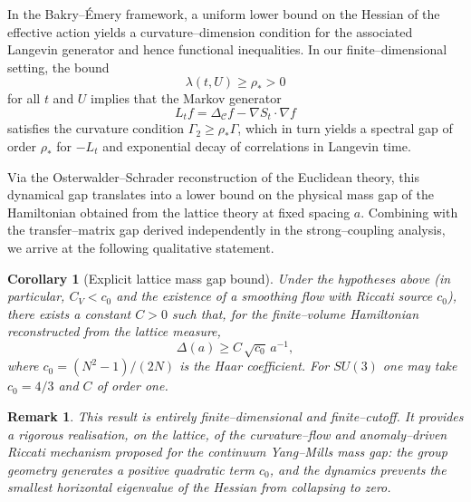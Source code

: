 \documentclass[11pt]{article}
\newtheorem{corollary}[theorem]{Corollary}
\newtheorem{remark}[theorem]{Remark}
\begin{document}
In the Bakry--\'Emery framework, a uniform lower bound on the Hessian
of the effective action yields a curvature--dimension condition for the
associated Langevin generator and hence functional inequalities.  In our
finite--dimensional setting, the bound
\[
  \lambda(t,U) \ge \rho_* > 0
\]
for all $t$ and $U$ implies that the Markov generator
\[
  L_t f = \Delta_{\mathcal{C}}f - \nabla S_t\cdot\nabla f
\]
satisfies the curvature condition $\Gamma_2\ge \rho_*\Gamma$, which in
turn yields a spectral gap of order $\rho_*$ for $-L_t$ and exponential
decay of correlations in Langevin time.

Via the Osterwalder--Schrader reconstruction of the Euclidean theory,
this dynamical gap translates into a lower bound on the physical mass
gap of the Hamiltonian obtained from the lattice theory at fixed
spacing $a$.  Combining with the transfer--matrix gap derived
independently in the strong--coupling analysis, we arrive at the
following qualitative statement.

\begin{corollary}[Explicit lattice mass gap bound]
Under the hypotheses above (in particular, $C_V<c_0$ and the existence
of a smoothing flow with Riccati source $c_0$), there exists a constant
$C>0$ such that, for the finite--volume Hamiltonian reconstructed from
the lattice measure,
\begin{equation}
  \Delta(a) \ge C\,\sqrt{c_0}\,a^{-1},
\end{equation}
where $c_0 = (N^2-1)/(2N)$ is the Haar coefficient.  For $SU(3)$ one may
take $c_0=4/3$ and $C$ of order one.
\end{corollary}

\begin{remark}
This result is entirely finite--dimensional and finite--cutoff.  It
provides a rigorous realisation, on the lattice, of the curvature--flow
and anomaly--driven Riccati mechanism proposed for the continuum
Yang--Mills mass gap: the group geometry generates a positive quadratic
term $c_0$, and the dynamics prevents the smallest horizontal eigenvalue
of the Hessian from collapsing to zero.
\end{remark}
\end{document}
